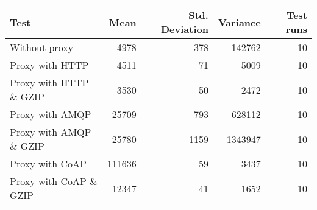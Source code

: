 \begin{tabular}{lrrrr}
\hline
 Test                   &   Mean &   Std. Deviation &   Variance &   Test runs \\
\hline
 Without proxy          &   4978 &              378 &     142762 &          10 \\
 Proxy with HTTP        &   4511 &               71 &       5009 &          10 \\
 Proxy with HTTP \& GZIP &   3530 &               50 &       2472 &          10 \\
 Proxy with AMQP        &  25709 &              793 &     628112 &          10 \\
 Proxy with AMQP \& GZIP &  25780 &             1159 &    1343947 &          10 \\
 Proxy with CoAP        & 111636 &               59 &       3437 &          10 \\
 Proxy with CoAP \& GZIP &  12347 &               41 &       1652 &          10 \\
\hline
\end{tabular}